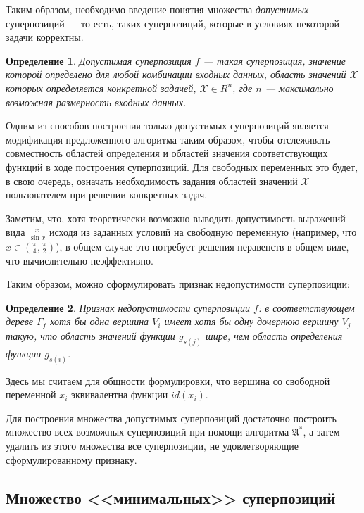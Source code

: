 \documentclass[12pt,a4paper]{amsart}
\newtheorem{defin}{Определение}
\begin{document}
Таким образом, необходимо введение понятия множества \emph{допустимых}
суперпозиций --- то есть, таких суперпозиций, которые в условиях некоторой
задачи корректны.

\begin{defin}
  Допустимая суперпозиция $f$ --- такая суперпозиция, значение которой
  определено для любой комбинации входных данных, область значений
  $\mathcal{X}$ которых определяется конкретной задачей, $\mathcal{X} \in R^n$,
  где $n$ --- максимально возможная размерность входных данных.
\end{defin}

Одним из способов построения только допустимых суперпозиций является
модификация предложенного алгоритма таким образом, чтобы отслеживать
совместность областей определения и областей значения соответствующих
функций в ходе построения суперпозиций. Для свободных переменных это будет,
в свою очередь, означать необходимость задания областей значений
$\mathcal{X}$ пользователем при решении конкретных задач.

Заметим, что, хотя теоретически возможно выводить допустимость выражений
вида $\frac{x}{\sin x}$ исходя из заданных условий на свободную переменную
(например, что $x \in (\frac{\pi}{4}, \frac{\pi}{2})$), в общем случае это
потребует решения неравенств в общем виде, что вычислительно неэффективно.

Таким образом, можно сформулировать признак недопустимости суперпозиции:

\begin{defin}
  Признак недопустимости суперпозиции $f$: в соответствующем дереве
  $\Gamma_f$ хотя бы одна вершина $V_i$ имеет хотя бы одну дочернюю вершину
  $V_j$ такую, что область значений функции $g_{s(j)}$ шире, чем область
  определения функции $g_{s(i)}$.
\end{defin}

Здесь мы считаем для общности формулировки, что вершина со свободной
переменной $x_i$ эквивалентна функции $id (x_i)$.

Для построения множества допустимых суперпозиций достаточно построить
множество всех возможных суперпозиций при помощи алгоритма $\mathfrak{A}^*$,
а затем удалить из этого множества все суперпозиции, не удовлетворяющие
сформулированному признаку.

\subsection{Множество <<минимальных>> суперпозиций}
\end{document}
